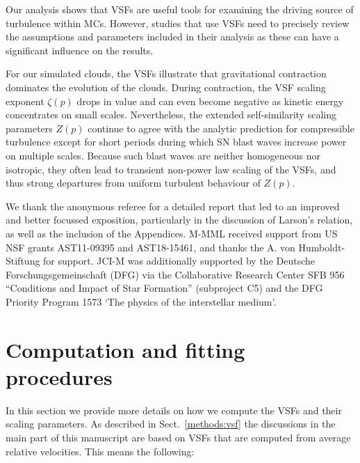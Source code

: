 \documentclass{aa}		%
\begin{document}
Our analysis shows that VSFs are useful tools for examining the driving source of turbulence within MCs.
However, studies that use VSFs need to precisely review the assumptions and parameters included in their analysis as these can have a significant influence on the results.

For our simulated clouds, the VSFs illustrate that gravitational contraction dominates the evolution of the clouds.
During contraction, the VSF scaling exponent $\zeta(p)$ drops in value and can even become negative as kinetic energy concentrates on small scales.
Nevertheless, the extended self-similarity scaling parameters $Z(p)$ continue to agree with the analytic prediction for compressible turbulence except for short periods during which SN blast waves increase power on multiple scales.
Because such blast waves are neither homogeneous nor isotropic, they often lead to transient non-power law scaling of the VSFs, and thus strong departures from uniform turbulent behaviour of $Z(p)$.




 
\begin{acknowledgements} 
    We thank the anonymous referee for a detailed report that led to an improved and better focussed exposition, particularly in the discussion of Larson's relation, as well as the inclusion of the Appendices.
    M-MML received support from US NSF grants AST11-09395 and AST18-15461, and thanks the A. von Humboldt-Stiftung for support.  
    JCI-M was additionally supported by the Deutsche Forschungsgemeinschaft (DFG) via the  Collaborative  Research  Center  SFB  956  ``Conditions and  Impact  of  Star  Formation'' (subproject  C5) and the  DFG  Priority  Program 1573 ‘The physics of the interstellar medium’.
\end{acknowledgements}



\appendix

\section{Computation and fitting procedures}\label{appFitting}

In this section we provide more details on how we compute the VSFs and their scaling parameters.
As described in Sect.~\ref{methods:vsf} the discussions in the main part of this manuscript are based on VSFs that are computed from average relative velocities. 
This means the following:
\end{document}
